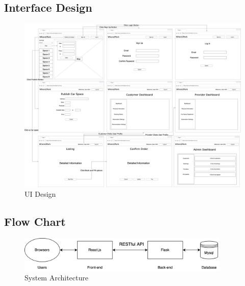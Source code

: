 \documentclass[12pt]{article}
\begin{document}
  \subsection{Interface Design}
  \begin{figure}[htp]
    \centering
    \includegraphics[width=\textwidth]{UI Design-UI.drawio.png}

  \caption{UI Design}
  \end{figure}
  \newpage
  \subsection{Flow Chart}

    \begin{figure}[htp]
      \centering
    \includegraphics[width=0.9\textwidth]{UI Design-System Architecture.drawio.png}
    
    \caption{System Architecture}
    \end{figure}
\end{document}
